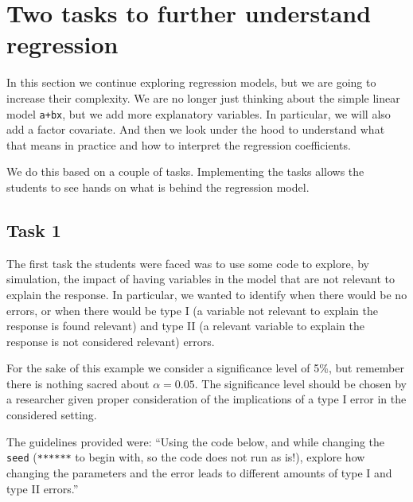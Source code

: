 \documentclass[
]{book}
\begin{document}
\section{Two tasks to further understand regression}\label{two-tasks-to-further-understand-regression}

In this section we continue exploring regression models, but we are going to increase their complexity. We are no longer just thinking about the simple linear model \texttt{a+bx}, but we add more explanatory variables. In particular, we will also add a factor covariate. And then we look under the hood to understand what that means in practice and how to interpret the regression coefficients.

We do this based on a couple of tasks. Implementing the tasks allows the students to see hands on what is behind the regression model.

\subsection{Task 1}\label{task-1}

The first task the students were faced was to use some code to explore, by simulation, the impact of having variables in the model that are not relevant to explain the response. In particular, we wanted to identify when there would be no errors, or when there would be type I (a variable not relevant to explain the response is found relevant) and type II (a relevant variable to explain the response is not considered relevant) errors.

For the sake of this example we consider a significance level of 5\%, but remember there is nothing sacred about \(\alpha=0.05\). The significance level should be chosen by a researcher given proper consideration of the implications of a type I error in the considered setting.

The guidelines provided were: ``Using the code below, and while changing the \texttt{seed} (\texttt{******} to begin with, so the code does not run as is!), explore how changing the parameters and the error leads to different amounts of type I and type II errors.''
\end{document}
